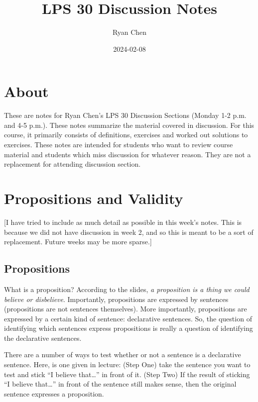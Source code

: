 \documentclass[
]{book}
\title{LPS 30 Discussion Notes}
\author{Ryan Chen}
\date{2024-02-08}
\begin{document}
\maketitle

{
\setcounter{tocdepth}{1}
\tableofcontents
}
\hypertarget{about}{%
\chapter{About}\label{about}}

These are notes for Ryan Chen's LPS 30 Discussion Sections (Monday 1-2 p.m. and 4-5 p.m.). These notes summarize the material covered in discussion. For this course, it primarily consists of definitions, exercises and worked out solutions to exercises. These notes are intended for students who want to review course material and students which miss discussion for whatever reason. They are not a replacement for attending discussion section.

\hypertarget{propositions-and-validity}{%
\chapter{Propositions and Validity}\label{propositions-and-validity}}

{[}I have tried to include as much detail as possible in this week's notes. This is because we did not have discussion in week 2, and so this is meant to be a sort of replacement. Future weeks may be more sparse.{]}

\hypertarget{propositions}{%
\section{Propositions}\label{propositions}}

What is a proposition? According to the slides, \emph{a proposition is a thing we could believe or disbelieve}. Importantly, propositions are expressed by sentences (propositions are not sentences themselves). More importantly, propositions are expressed by a certain kind of sentence: declarative sentences. So, the question of identifying which sentences express propositions is really a question of identifying the declarative sentences.

There are a number of ways to test whether or not a sentence is a declarative sentence. Here, is one given in lecture: (Step One) take the sentence you want to test and stick ``I believe that\ldots{}'' in front of it. (Step Two) If the result of sticking ``I believe that\ldots{}'' in front of the sentence still makes sense, then the original sentence expresses a proposition.
\end{document}
